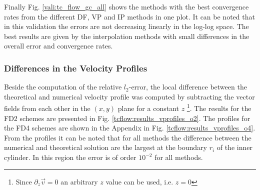 Finally Fig. \ref{vali:tc_flow_gc_all} shows the methods with the best convergence
rates from the different DF, VP and IP methods in one plot.
It can be noted that in this validation the errors are not decreasing linearly in the log-log space.
The best results are given by the interpolation methods with small differences in the overall error
and convergence rates.

\subsubsection{Differences in the Velocity Profiles}

Beside the computation of the relative $l_2$-error, the local difference between the theoretical and numerical velocity
profile was computed by subtracting the vector fields from each other in the $(x, y)$ plane for a constant $z$
\footnote{Since $\partial_z \vec{v} = 0$ an arbitrary $z$ value can be used, i.e. $z=0$}.
The results for the FD2 schemes are presented in Fig. \ref{tcflow:results_vprofiles_o2}. The profiles
for the FD4 schemes are shown in the Appendix in Fig. \ref{tcflow:results_vprofiles_o4}.
From the profiles it can be noted that for all methods the difference between the numerical and
theoretical solution are the largest at the boundary $r_i$ of the  inner cylinder.
In this region the error is of order $10^{-2}$ for all methods.

